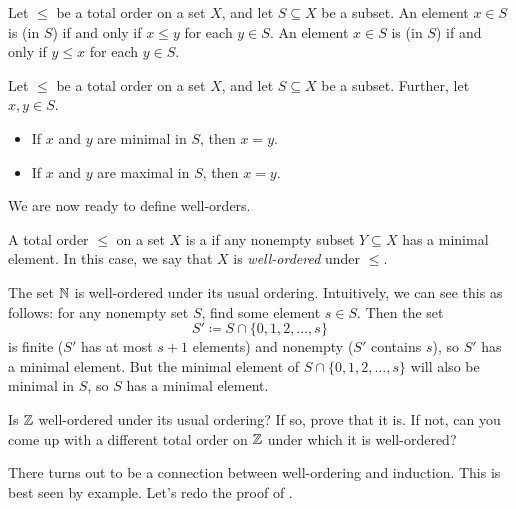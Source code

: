 \documentclass[../main.tex]{subfiles}
\begin{document}
\begin{definition}
    Let $\le$ be a total order on a set $X$, and let $S\subseteq X$ be a subset. An element $x \in S$ is  (in $S$) if and only if $x \le y$ for each $y \in S$. An element $x \in S$ is  (in $S$) if and only if $y \le x$ for each $y \in S$.
\end{definition}
\begin{exe}
    Let $\le$ be a total order on a set $X$, and let $S\subseteq X$ be a subset. Further, let $x,y\in S$.
    \begin{itemize}
        \item If $x$ and $y$ are minimal in $S$, then $x = y$.
        \item If $x$ and $y$ are maximal in $S$, then $x = y$.
    \end{itemize}
\end{exe}
We are now ready to define well-orders.
\begin{definition}
    A total order $\le$ on a set $X$ is a  if any nonempty subset $Y \subseteq X$ has a minimal element. In this case, we say that $X$ is \textit{well-ordered} under $\le$.
\end{definition}
\begin{ex} \label{ex:n-well-order}
    The set $\mathbb N$ is well-ordered under its usual ordering. Intuitively, we can see this as follows: for any nonempty set $S$, find some element $s\in S$. Then the set
    \[S'\coloneqq S\cap\{0,1,2,\ldots,s\}\]
    is finite ($S'$ has at most $s+1$ elements) and nonempty ($S'$ contains $s$), so $S'$ has a minimal element. But the minimal element of $S\cap\{0,1,2,\ldots,s\}$ will also be minimal in $S$, so $S$ has a minimal element.
\end{ex}
\begin{exe}
    Is $\mathbb Z$ well-ordered under its usual ordering? If so, prove that it is. If not, can you come up with a different total order on $\mathbb Z$ under which it is well-ordered?
\end{exe}
There turns out to be a connection between well-ordering and induction. This is best seen by example. Let's redo the proof of .
\end{document}
